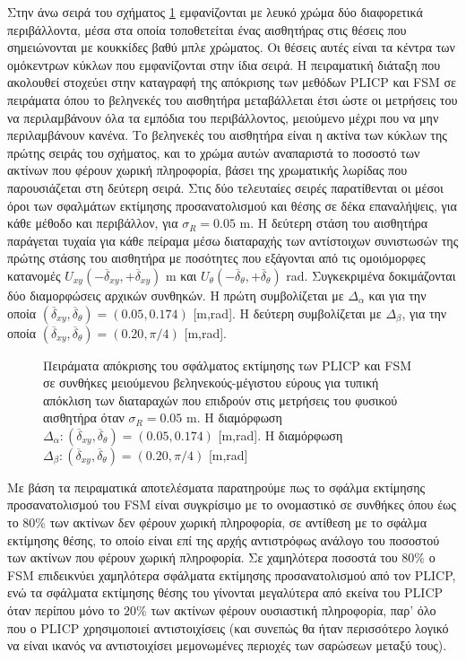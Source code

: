 Στην άνω σειρά του σχήματος \ref{fig:02_05_04:03} εμφανίζονται με λευκό χρώμα
δύο διαφορετικά περιβάλλοντα, μέσα στα οποία τοποθετείται ένας αισθητήρας στις
θέσεις που σημειώνονται με κουκκίδες βαθύ μπλε χρώματος. Οι θέσεις αυτές είναι
τα κέντρα των ομόκεντρων κύκλων που εμφανίζονται στην ίδια σειρά. Η πειραματική
διάταξη που ακολουθεί στοχεύει στην καταγραφή της απόκρισης των μεθόδων
PLICP και FSM σε πειράματα όπου το βεληνεκές του αισθητήρα
μεταβάλλεται έτσι ώστε οι μετρήσεις του να περιλαμβάνουν όλα τα εμπόδια του
περιβάλλοντος, μειούμενο μέχρι που να μην περιλαμβάνουν κανένα. Το βεληνεκές
του αισθητήρα είναι η ακτίνα των κύκλων της πρώτης σειράς του σχήματος, και το
χρώμα αυτών αναπαριστά το ποσοστό των ακτίνων που φέρουν χωρική πληροφορία,
βάσει της χρωματικής λωρίδας που παρουσιάζεται στη δεύτερη σειρά. Στις δύο
τελευταίες σειρές παρατίθενται οι μέσοι όροι των σφαλμάτων εκτίμησης
προσανατολισμού και θέσης σε δέκα επαναλήψεις, για κάθε μέθοδο και περιβάλλον,
για $\sigma_R = 0.05$ m. Η δεύτερη στάση του αισθητήρα παράγεται τυχαία για
κάθε πείραμα μέσω διαταραχής των αντίστοιχων συνιστωσών της πρώτης στάσης του
αισθητήρα με ποσότητες που εξάγονται από τις ομοιόμορφες κατανομές
$U_{xy}(-\overline{\delta}_{xy},+\overline{\delta}_{xy})$ m και
$U_{\theta}(-\overline{\delta}_{\theta},+\overline{\delta}_{\theta})$ rad.
Συγκεκριμένα δοκιμάζονται δύο διαμορφώσεις αρχικών συνθηκών. H πρώτη
συμβολίζεται με $\Delta_\alpha$ και για την οποία
$(\overline{\delta}_{xy}, \overline{\delta}_{\theta}) = (0.05,0.174)$ [m,rad].
Η δεύτερη συμβολίζεται με $\Delta_\beta$, για την οποία
$(\overline{\delta}_{xy},\overline{\delta}_{\theta}) = (0.20,\pi/4)$ [m,rad].

\begin{figure}[]\centering
  
  \vspace{-2cm}
  \caption{\small Πειράματα απόκρισης του σφάλματος εκτίμησης των PLICP
           και FSM σε συνθήκες μειούμενου βεληνεκούς-μέγιστου εύρους
           για τυπική απόκλιση των διαταραχών που επιδρούν στις μετρήσεις του
           φυσικού αισθητήρα όταν $\sigma_R = 0.05$ m. Η διαμόρφωση
           $\Delta_\alpha: (\overline{\delta}_{xy}, \overline{\delta}_{\theta})
           = (0.05,0.174)$ [m,rad]. Η διαμόρφωση $\Delta_\beta:
           (\overline{\delta}_{xy},\overline{\delta}_{\theta}) = (0.20,\pi/4)$
           [m,rad]}
  \label{fig:02_05_04:03}
\end{figure}

Με βάση τα πειραματικά αποτελέσματα παρατηρούμε πως το σφάλμα εκτίμησης
προσανατολισμού του FSM είναι συγκρίσιμο με το ονομαστικό σε συνθήκες
όπου έως το $80\%$ των ακτίνων δεν φέρουν χωρική πληροφορία, σε αντίθεση με το
σφάλμα εκτίμησης θέσης, το οποίο είναι επί της αρχής αντιστρόφως ανάλογο του
ποσοστού των ακτίνων που φέρουν χωρική πληροφορία. Σε χαμηλότερα ποσοστά του
$80\%$ ο FSM επιδεικνύει χαμηλότερα σφάλματα εκτίμησης προσανατολισμού
από τον PLICP, ενώ τα σφάλματα εκτίμησης θέσης του γίνονται μεγαλύτερα από
εκείνα του PLICP όταν περίπου μόνο το $20\%$ των ακτίνων φέρουν ουσιαστική
πληροφορία, παρ' όλο που ο PLICP χρησιμοποιεί αντιστοιχίσεις (και συνεπώς θα
ήταν περισσότερο λογικό να είναι ικανός να αντιστοιχίσει μεμονωμένες περιοχές
των σαρώσεων μεταξύ τους).

